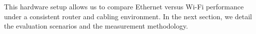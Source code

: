 







        This hardware setup allows us to compare Ethernet versus Wi-Fi performance 
        under a consistent router and cabling environment. 
        In the next section, we detail the evaluation scenarios and 
        the measurement methodology.

